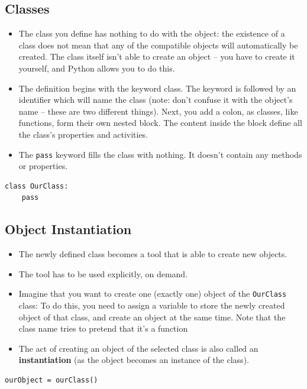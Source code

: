 \documentclass[11pt]{article}
\begin{document}
\subsection{Classes}
\label{sec:orgda37f33}
\begin{itemize}
\item The class you define has nothing to do with the object: the
existence of a class does not mean that any of the compatible
objects will automatically be created. The class itself isn’t able
to create an object – you have to create it yourself, and Python
allows you to do this.
\item The definition begins with the keyword class. The keyword is
followed by an identifier which will name the class (note: don’t
confuse it with the object’s name – these are two different
things). Next, you add a colon, as classes, like functions, form
their own nested block. The content inside the block define all the
class’s properties and activities.
\item The \texttt{pass} keyword fills the class with nothing. It doesn’t contain
any methods or properties.
\end{itemize}

\begin{verbatim}
class OurClass:
    pass
\end{verbatim}

\subsection{Object Instantiation}
\label{sec:org8ee2d77}
\begin{itemize}
\item The newly defined class becomes a tool that is able to create new
objects.
\item The tool has to be used explicitly, on demand.
\item Imagine that you want to create one (exactly one) object of the
\texttt{OurClass} class: 
To do this, you need to assign a variable to store
the newly created object of that class, and create an object at the
same time. Note that the class name tries to pretend that it’s a
function
\item The act of creating an object of the selected class is also called
an \textbf{instantiation} (as the object becomes an instance of the class).
\end{itemize}

\begin{verbatim}
ourObject = ourClass()
\end{verbatim}
\end{document}
